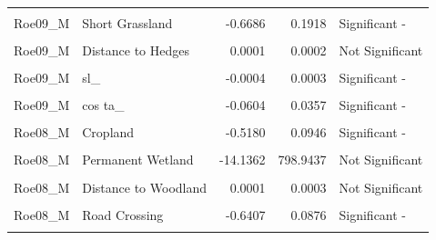 \documentclass[10pt,a4paper]{article}
\begin{document}
\begin{longtable}[t]{llrrl}
\cellcolor{gray!10}{Roe09\_M} & \cellcolor{gray!10}{Tall Grassland} & \cellcolor{gray!10}{0.1288} & \cellcolor{gray!10}{0.1342} & \cellcolor{gray!10}{Not Significant}\\
\addlinespace
Roe09\_M & Short Grassland & -0.6686 & 0.1918 & Significant -\\
\cellcolor{gray!10}{Roe09\_M} & \cellcolor{gray!10}{Distance to Woodland} & \cellcolor{gray!10}{-0.0024} & \cellcolor{gray!10}{0.0003} & \cellcolor{gray!10}{Significant -}\\
Roe09\_M & Distance to Hedges & 0.0001 & 0.0002 & Not Significant\\
\cellcolor{gray!10}{Roe09\_M} & \cellcolor{gray!10}{Road Crossing} & \cellcolor{gray!10}{17.9570} & \cellcolor{gray!10}{888.3601} & \cellcolor{gray!10}{Not Significant}\\
Roe09\_M & sl\_ & -0.0004 & 0.0003 & Significant -\\
\addlinespace
\cellcolor{gray!10}{Roe09\_M} & \cellcolor{gray!10}{log sl\_} & \cellcolor{gray!10}{0.0731} & \cellcolor{gray!10}{0.0447} & \cellcolor{gray!10}{Significant +}\\
Roe09\_M & cos ta\_ & -0.0604 & 0.0357 & Significant -\\
\cellcolor{gray!10}{Roe08\_M} & \cellcolor{gray!10}{Evergreen Needleleaf Forest} & \cellcolor{gray!10}{-1.1324} & \cellcolor{gray!10}{0.5334} & \cellcolor{gray!10}{Significant -}\\
Roe08\_M & Cropland & -0.5180 & 0.0946 & Significant -\\
\cellcolor{gray!10}{Roe08\_M} & \cellcolor{gray!10}{Tall Grassland} & \cellcolor{gray!10}{-0.6843} & \cellcolor{gray!10}{0.0997} & \cellcolor{gray!10}{Significant -}\\
\addlinespace
Roe08\_M & Permanent Wetland & -14.1362 & 798.9437 & Not Significant\\
\cellcolor{gray!10}{Roe08\_M} & \cellcolor{gray!10}{Human Settlements} & \cellcolor{gray!10}{-1.6119} & \cellcolor{gray!10}{0.7258} & \cellcolor{gray!10}{Significant -}\\
Roe08\_M & Distance to Woodland & 0.0001 & 0.0003 & Not Significant\\
\cellcolor{gray!10}{Roe08\_M} & \cellcolor{gray!10}{Distance to Hedges} & \cellcolor{gray!10}{-0.0015} & \cellcolor{gray!10}{0.0003} & \cellcolor{gray!10}{Significant -}\\
Roe08\_M & Road Crossing & -0.6407 & 0.0876 & Significant -\\
\addlinespace
\cellcolor{gray!10}{Roe08\_M} & \cellcolor{gray!10}{sl\_} & \cellcolor{gray!10}{0.0008} & \cellcolor{gray!10}{0.0003} & \cellcolor{gray!10}{Significant +}\\

\end{longtable}
\end{document}
